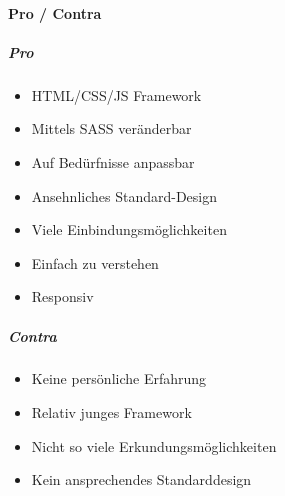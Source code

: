 		\paragraph{Pro / Contra}
		\subparagraph{Pro}
		\begin{itemize}
			\item HTML/CSS/JS Framework
			\item Mittels SASS veränderbar
			\item Auf Bedürfnisse anpassbar
			\item Ansehnliches Standard-Design 
			\item Viele Einbindungsmöglichkeiten
			\item Einfach zu verstehen
			\item Responsiv
		\end{itemize}
		\subparagraph{Contra}
		\begin{itemize}
			\item Keine persönliche Erfahrung
			\item Relativ junges Framework
			\item Nicht so viele Erkundungsmöglichkeiten
			\item Kein ansprechendes Standarddesign
		\end{itemize}

